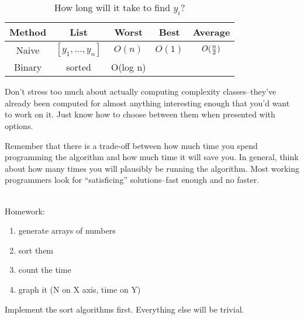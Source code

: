 \documentclass[12pt,letter]{article}
\begin{document}

\begin{table}
\begin{center}
\caption{How long will it take to find $y_i$?}
\begin{tabular}{ccccc}
Method & List & Worst & Best & Average \\
\hline
Naive & $[y_1, ..., y_n]$ & $O(n) $ & $O(1)$ & $O({n\over2})$ \\
Binary & sorted & O(log n) & \\
\end{tabular}
\end{center}
\end{table}

Don't stress too much about actually computing complexity
classes--they've already been computed for almost anything interesting
enough that you'd want to work on it. Just know how to choose between
them when presented with options. 

Remember that there is a trade-off between how much time you spend
programming the algorithm and how much time it will save you. In
general, think about how many times you will plausibly be running the
algorithm. Most working programmers look for ``satisficing''
solutions--fast enough and no faster. 
 
~\\
Homework:
\begin{enumerate}
\item generate arrays of numbers
\item sort them
\item count the time
\item graph it (N on X axis, time on Y)
\end{enumerate}

Implement the sort algorithms first. Everything else will be trivial.

\pagebreak
\onehalfspacing



\pagebreak
\end{document}
